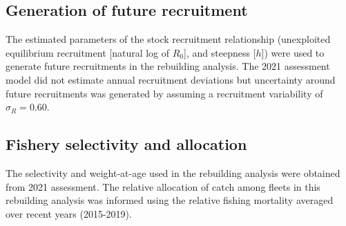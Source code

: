\documentclass[11pt,
  english,
  a4paper,
]{article}
\begin{document}
\leavevmode\tagmcend\tagstructend\par


\hypertarget{generation-of-future-recruitment}{%
\subsection{Generation of future recruitment}\label{generation-of-future-recruitment}}

\leavevmode\tagmcend\tagstructend


The estimated parameters of the stock recruitment relationship (unexploited equilibrium recruitment {[}natural log of {\(R_0\)\leavevmode\tagmcend\tagstructend}{]}, and steepness {[}{\(h\)\leavevmode\tagmcend\tagstructend}{]}) were used to generate future recruitments in the rebuilding analysis. The 2021 assessment model did not estimate annual recruitment deviations but uncertainty around future recruitments was generated by assuming a recruitment variability of {\(\sigma_R = 0.60\)\leavevmode\tagmcend\tagstructend}.

\leavevmode\tagmcend\tagstructend\par


\hypertarget{fishery-selectivity-and-allocation}{%
\subsection{Fishery selectivity and allocation}\label{fishery-selectivity-and-allocation}}

\leavevmode\tagmcend\tagstructend


The selectivity and weight-at-age used in the rebuilding analysis were obtained from 2021 assessment. The relative allocation of catch among fleets in this rebuilding analysis was informed using the relative fishing mortality averaged over recent years (2015-2019).

\leavevmode\tagmcend\tagstructend\par

\end{document}
